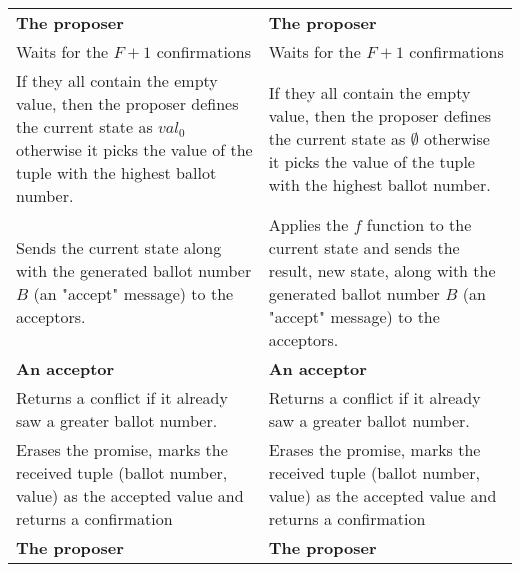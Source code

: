 \documentclass[a4paper,USenglish]{lipics-v2018}
\theoremstyle{definition}
\begin{document}
\begin{center}
\begin{longtable}{p{15em}|p{15em}}
        \hline
        
        {\bf The proposer}
        &
        {\bf The proposer} \\[6pt]
        
        
        Waits for the $F+1$ confirmations
        &
        Waits for the $F+1$ confirmations \\[6pt]
        
        
        If they all contain the empty value, then the proposer defines the current state as   $val_0$ otherwise it picks the value of the tuple with the highest ballot number.
        &
        If they all contain the empty value, then the proposer defines the current state as   $\emptyset$ otherwise it picks the value of the tuple with the highest ballot number.
        \\[6pt]
        
        
        Sends the current state along with the generated ballot number $B$ (an "accept"   message) to the acceptors.
        &
        Applies the $f$ function to the current state and sends the result, new state, along   with the generated ballot number $B$ (an "accept" message) to the acceptors.
        \\[6pt]
        
        \hline
        
        {\bf An acceptor}
        &
        {\bf An acceptor} \\[6pt]
        
        
        Returns a conflict if it already saw a greater ballot number.
        &
        Returns a conflict if it already saw a greater ballot number.
        \\[6pt]
        
        
        Erases the promise, marks the received tuple (ballot number, value) as the accepted   value and returns a confirmation
        &
        Erases the promise, marks the received tuple (ballot number, value) as the accepted   value and returns a confirmation
        \\[6pt]
        
        \hline
        
        {\bf The proposer}
        &
        {\bf The proposer} \\[6pt]
        

\end{longtable}
\end{center}
\end{document}
